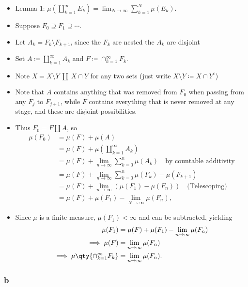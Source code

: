 \begin{solution}
\begin{itemize}
\item
  Lemma 1:
  \(\mu({\coprod}_{k=1}^\infty E_k) = \lim_{N\to\infty} \sum_{k=1}^N \mu(E_k)\).
\item
  Suppose \(F_0 \supseteq F_1 \supseteq \cdots\).
\item
  Let \(A_k = F_k \setminus F_{k+1}\), since the \(F_k\) are nested the
  \(A_k\) are disjoint
\item
  Set \(A \coloneqq{\coprod}_{k=1}^\infty A_k\) and
  \(F \coloneqq\cap_{k=1}^\infty F_k\).
\item
  Note \(X = X\setminus Y ~{\coprod}~ X\cap Y\) for any two sets (just
  write \(X\setminus Y \coloneqq X\cap Y^c\))
\item
  Note that \(A\) contains anything that was removed from \(F_0\) when
  passing from any \(F_j\) to \(F_{j+1}\), while \(F\) contains
  everything that is never removed at any stage, and these are disjoint
  possibilities.
\item
  Thus \(F_0 = F {\coprod}A\), so
  \begin{align*}
  \mu(F_0) 
  &= \mu(F) + \mu(A) \\
  &= \mu(F) + \mu({\coprod}_{k=1}^\infty A_k) \\
  &= \mu(F) + \lim_{n\to\infty} \sum_{k=0}^n \mu(A_k) \quad \text{by countable additivity}\\
  &= \mu(F) + \lim_{n\to\infty} \sum_{k=0}^n \mu(F_k) - \mu(F_{k+1}) \\
  &= \mu(F) + \lim_{n\to\infty} \left( \mu(F_1) - \mu(F_n) \right) \quad\text{(Telescoping)} \\
  &=\mu(F) + \mu(F_1) - \lim_{N\to\infty} \mu(F_n)
  ,\end{align*}
\item
  Since \(\mu\) is a finite measure, \(\mu(F_1) < \infty\) and can be
  subtracted, yielding
  \begin{align*}
  \mu(F_1) &= \mu(F) + \mu(F_1) - \lim_{n\to\infty} \mu(F_n) \\
  \implies \mu(F) &= \lim_{n\to\infty} \mu(F_n) \\
  \implies \mu\qty{\cap_{k=1}^\infty F_k} &= \lim_{n\to\infty} \mu(F_n)
  .\end{align*}
\end{itemize}

\hypertarget{b-3}{%
\subsubsection{b}\label{b-3}}


\end{solution}
